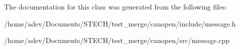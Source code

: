 The documentation for this class was generated from the following files\+:\begin{DoxyCompactItemize}
\item 
/home/adev/\+Documents/\+S\+T\+E\+C\+H/test\+\_\+merge/canopen/include/message.\+h\item 
/home/adev/\+Documents/\+S\+T\+E\+C\+H/test\+\_\+merge/canopen/src/message.\+cpp\end{DoxyCompactItemize}
